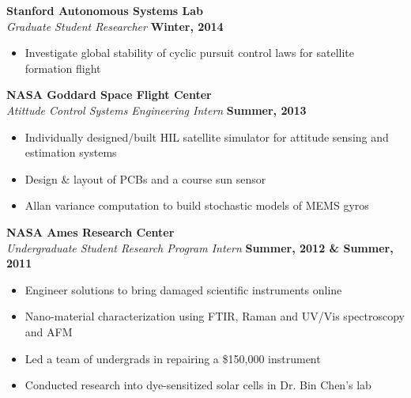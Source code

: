 \documentclass[margin,line]{resume}
\begin{document}
\begin{resume}
    \textbf{Stanford Autonomous Systems Lab}\\
    \textsl{Graduate Student Researcher} \hfill \textbf{Winter, 2014}\\ \vspace{-4mm}
    \begin{itemize} \itemsep -2pt
        \item Investigate global stability of cyclic pursuit control laws for satellite formation flight
    \end{itemize} \vspace{-2.25mm}

    \textbf{NASA Goddard Space Flight Center}\\
    \textsl{Atittude Control Systems Engineering Intern} \hfill \textbf{Summer, 2013}\\ \vspace{-4mm}
    \begin{itemize} \itemsep -2pt
        \item Individually designed/built HIL satellite simulator for attitude sensing and estimation systems
        \item Design \& layout of PCBs and a course sun sensor
        \item Allan variance computation to build stochastic models of MEMS gyros
    \end{itemize} \vspace{-2.25mm}

    \textbf{NASA Ames Research Center}\\ %
    \textsl{Undergraduate Student Research Program Intern} \hfill \textbf{Summer, 2012 \& Summer, 2011}\\ \vspace{-4mm}
    \begin{itemize} \itemsep -2pt
    	\item Engineer solutions to bring damaged scientific instruments online
    	\item Nano-material characterization using FTIR, Raman and UV/Vis spectroscopy and AFM
        \item Led a team of undergrads in repairing a \$150,000 instrument
        \item Conducted research into dye-sensitized solar cells in Dr. Bin Chen's lab
    \end{itemize} \vspace{-2.25mm}


\end{resume}
\end{document}
